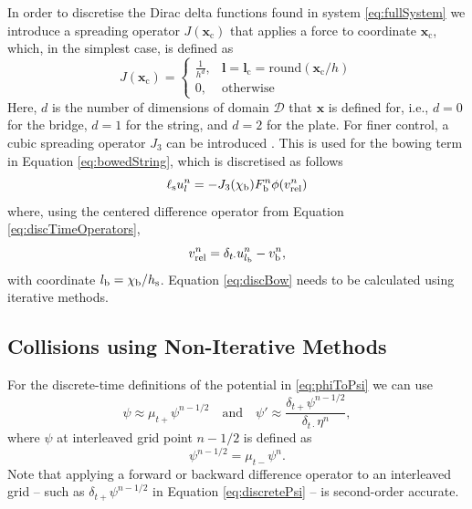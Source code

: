     In order to discretise the Dirac delta functions found in system \eqref{eq:fullSystem} we introduce a spreading operator $J(\boldsymbol{x}_\text{c})$ that applies a force to coordinate $\boldsymbol{x}_\text{c}$, which, in the simplest case, is defined as \cite{bilbao2009numerical}
    \begin{equation}
       J(\boldsymbol{x}_\text{c}) = \begin{cases}
           \frac{1}{h^d}, & \boldsymbol{l} = \boldsymbol{l}_\text{c} = \text{round}(\boldsymbol{x}_\text{c} / h)\\
           0, & \text{otherwise}
       \end{cases}
    \end{equation}
    Here, $d$ is the number of dimensions of domain $\mathcal{D}$ that $\boldsymbol{x}$ is defined for, i.e., $d=0$ for the bridge, $d=1$ for the string, and $d=2$ for the plate. For finer control, a cubic spreading operator $J_3$ can be introduced \cite{bilbao2009numerical}. This is used for the bowing term in Equation \eqref{eq:bowedString}, which is discretised as follows
    \begin{equation}
        \ell_\text{s}u^n_l = -J_3(\chi_\text{b})F_\text{b}^n\phi(v_\text{rel}^n)
    \end{equation}
    where, using the centered difference operator from Equation \eqref{eq:discTimeOperators},
    \begin{equation}\label{eq:discBow}
        v_\text{rel}^n = \delta_{t\cdot}u_{l_\text{b}}^n-v_\text{b}^n,
    \end{equation}
    with coordinate $l_\text{b} = \chi_\text{b}/h_\text{s}$. Equation \eqref{eq:discBow} needs to be calculated using iterative methods.
    
    \subsection{Collisions using Non-Iterative Methods}
    
    For the discrete-time definitions of the potential in \eqref{eq:phiToPsi} we can use 
    \begin{equation}\label{eq:discretePsi}
        \psi\approx \mu_{t+}\psi^{n-1/2}\quad \text{and} \quad \psi' \approx \frac{\delta_{t+}\psi^{n-1/2}}{\delta_{t\cdot}\eta^n},
    \end{equation}
    where $\psi$ at interleaved grid point $n-1/2$ is defined as
    \begin{equation}
        \psi^{n-1/2} = \mu_{t-}\psi^n.
    \end{equation}
    Note that applying a forward or backward difference operator to an interleaved grid -- such as $\delta_{t+}\psi^{n-1/2}$ in Equation \eqref{eq:discretePsi} -- is second-order accurate.
    
